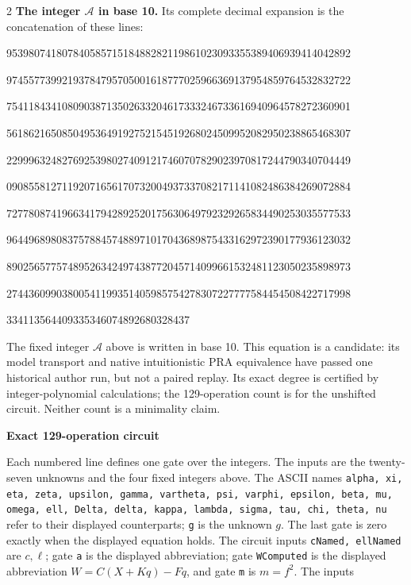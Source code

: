 \documentclass[10pt]{article}
\begin{document}
\begin{multicols}{2}
\textbf{The integer $\mathcal A$ in base 10.}
Its complete decimal expansion is the concatenation of these lines:\par
\begingroup\fontsize{7.7}{8.2}\selectfont{}\par
95398074180784058571518488282119861023093355389406939414042892\par
97455773992193784795705001618777025966369137954859764532832722\par
75411843410809038713502633204617333246733616940964578272360901\par
56186216508504953649192752154519268024509952082950238865468307\par
22999632482769253980274091217460707829023970817244790340704449\par
09085581271192071656170732004937337082171141082486384269072884\par
72778087419663417942892520175630649792329265834490253035577533\par
96449689808375788457488971017043689875433162972390177936123032\par
89025657757489526342497438772045714099661532481123050235898973\par
27443609903800541199351405985754278307227777584454508422717998\par
334113564409335346074892680328437\par
\endgroup
\normalfont\fontsize{7.7}{8.2}\selectfont
The fixed integer $\mathcal A$ above is written in base 10. This equation is a candidate: its model transport and native intuitionistic PRA equivalence have passed one historical author run, but not a paired replay. Its exact degree is certified by integer-polynomial calculations;
the 129-operation count is for the unshifted circuit. Neither count is a
minimality claim.
\end{multicols}
\clearpage
\begin{center}{\large\bfseries Exact 129-operation circuit}\end{center}
Each numbered line defines one gate over the integers. The inputs are the
twenty-seven unknowns and the four fixed integers above. The ASCII names
\texttt{alpha, xi, eta, zeta, upsilon, gamma, vartheta, psi, varphi, epsilon, beta, mu, omega, ell, Delta, delta, kappa, lambda, sigma, tau, chi, theta, nu}
refer to their displayed counterparts; \texttt{g} is the unknown $g$. The last
gate is zero exactly when the displayed equation holds. The circuit inputs
\texttt{cNamed, ellNamed} are $c,\ell$; gate \texttt{a} is the displayed abbreviation; gate \texttt{WComputed} is the displayed abbreviation $W=C(X+Kq)-Fq$, and gate \texttt{m} is $m=f^2$. The inputs
\end{document}
